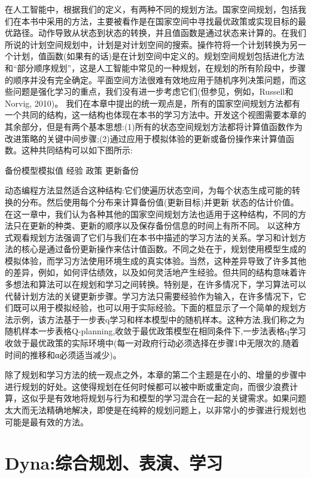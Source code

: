 在人工智能中，根据我们的定义，有两种不同的规划方法。国家空间规划，包括我们在本书中采用的方法，主要被看作是在国家空间中寻找最优政策或实现目标的最优路径。动作导致从状态到状态的转换，并且值函数是通过状态来计算的。在我们所说的计划空间规划中，计划是对计划空间的搜索。操作符将一个计划转换为另一个计划，值函数(如果有的话)是在计划空间中定义的。规划空间规划包括进化方法和“部分顺序规划”，这是人工智能中常见的一种规划，在规划的所有阶段中，步骤的顺序并没有完全确定。平面空间方法很难有效地应用于随机序列决策问题，而这些问题是强化学习的重点，我们没有进一步考虑它们(但参见，例如，Russell和Norvig, 2010)。
我们在本章中提出的统一观点是，所有的国家空间规划方法都有一个共同的结构，这一结构也体现在本书的学习方法中。开发这个视图需要本章的其余部分，但是有两个基本思想:(1)所有的状态空间规划方法都将计算值函数作为改进策略的关键中间步骤;(2)通过应用于模拟体验的更新或备份操作来计算值函数。这种共同结构可以如下图所示:

备份模型模拟值
经验 					政策
更新备份


动态编程方法显然适合这种结构:它们使遍历状态空间，为每个状态生成可能的转换的分布。然后使用每个分布来计算备份值(更新目标)并更新
状态的估计价值。在这一章中，我们认为各种其他的国家空间规划方法也适用于这种结构，不同的方法只在更新的种类、更新的顺序以及保存备份信息的时间上有所不同。
以这种方式观看规划方法强调了它们与我们在本书中描述的学习方法的关系。学习和计划方法的核心是通过备份更新操作来估计值函数。不同之处在于，规划使用模型生成的模拟体验，而学习方法使用环境生成的真实体验。当然，这种差异导致了许多其他的差异，例如，如何评估绩效，以及如何灵活地产生经验。但共同的结构意味着许多想法和算法可以在规划和学习之间转换。特别是，在许多情况下，学习算法可以代替计划方法的关键更新步骤。学习方法只需要经验作为输入，在许多情况下，它们既可以用于模拟经验，也可以用于实际经验。下面的框显示了一个简单的规划方法示例，该方法基于一步表q学习和样本模型中的随机样本。这种方法,我们称之为随机样本一步表格Q-planning,收敛于最优政策模型在相同条件下,一步法表格q学习收敛于最优政策的实际环境中(每一对政府行动必须选择在步骤1中无限次的,随着时间的推移和α必须适当减少)。
 

除了规划和学习方法的统一观点之外，本章的第二个主题是在小的、增量的步骤中进行规划的好处。这使得规划在任何时候都可以被中断或重定向，而很少浪费计算，这似乎是有效地将规划与行为和模型的学习混合在一起的关键需求。如果问题太大而无法精确地解决，即使是在纯粹的规划问题上，以非常小的步骤进行规划也可能是最有效的方法。


\section{Dyna:综合规划、表演、学习}

